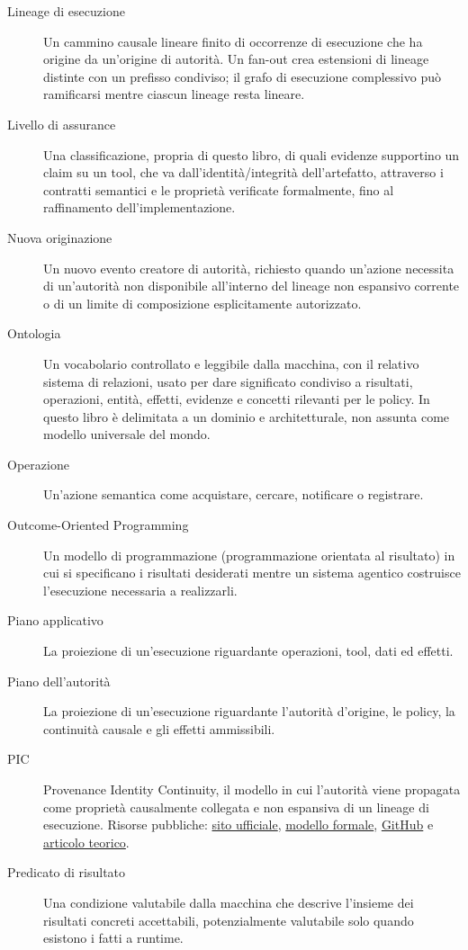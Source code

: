 \documentclass[10pt,oneside,openany]{book}
\begin{document}
\begin{description}
\item[Lineage di esecuzione] Un cammino causale lineare finito di occorrenze di esecuzione che ha origine da un'origine di autorità. Un fan-out crea estensioni di lineage distinte con un prefisso condiviso; il grafo di esecuzione complessivo può ramificarsi mentre ciascun lineage resta lineare.
\item[Livello di assurance] Una classificazione, propria di questo libro, di quali evidenze supportino un claim su un tool, che va dall'identità/integrità dell'artefatto, attraverso i contratti semantici e le proprietà verificate formalmente, fino al raffinamento dell'implementazione.
\item[Nuova originazione] Un nuovo evento creatore di autorità, richiesto quando un'azione necessita di un'autorità non disponibile all'interno del lineage non espansivo corrente o di un limite di composizione esplicitamente autorizzato.
\item[Ontologia] Un vocabolario controllato e leggibile dalla macchina, con il relativo sistema di relazioni, usato per dare significato condiviso a risultati, operazioni, entità, effetti, evidenze e concetti rilevanti per le policy. In questo libro è delimitata a un dominio e architetturale, non assunta come modello universale del mondo.
\item[Operazione] Un'azione semantica come acquistare, cercare, notificare o registrare.
\item[Outcome-Oriented Programming] Un modello di programmazione (programmazione orientata al risultato) in cui si specificano i risultati desiderati mentre un sistema agentico costruisce l'esecuzione necessaria a realizzarli.
\item[Piano applicativo] La proiezione di un'esecuzione riguardante operazioni, tool, dati ed effetti.
\item[Piano dell'autorità] La proiezione di un'esecuzione riguardante l'autorità d'origine, le policy, la continuità causale e gli effetti ammissibili.
\item[PIC] Provenance Identity Continuity, il modello in cui l'autorità viene propagata come proprietà causalmente collegata e non espansiva di un lineage di esecuzione. Risorse pubbliche: \href{https://www.pic-protocol.org}{sito ufficiale}, \href{https://www.pic-protocol.org/formal-model}{modello formale}, \href{https://github.com/pic-protocol}{GitHub} e \href{https://arxiv.org/abs/2607.08906}{articolo teorico}.
\item[Predicato di risultato] Una condizione valutabile dalla macchina che descrive l'insieme dei risultati concreti accettabili, potenzialmente valutabile solo quando esistono i fatti a runtime.

\end{description}
\end{document}

